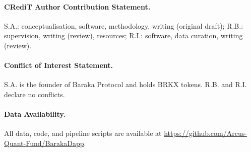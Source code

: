 \documentclass[12pt]{article}
\theoremstyle{plain}
\theoremstyle{definition}
\theoremstyle{remark}
\begin{document}
\paragraph{CRediT Author Contribution Statement.}
S.A.: conceptualisation, software, methodology, writing (original draft);
R.B.: supervision, writing (review), resources;
R.I.: software, data curation, writing (review).

\paragraph{Conflict of Interest Statement.}
S.A. is the founder of Baraka Protocol and holds BRKX tokens.
R.B. and R.I. declare no conflicts.

\paragraph{Data Availability.}
All data, code, and pipeline scripts are available at
\url{https://github.com/Arcus-Quant-Fund/BarakaDapp}.
\end{document}
